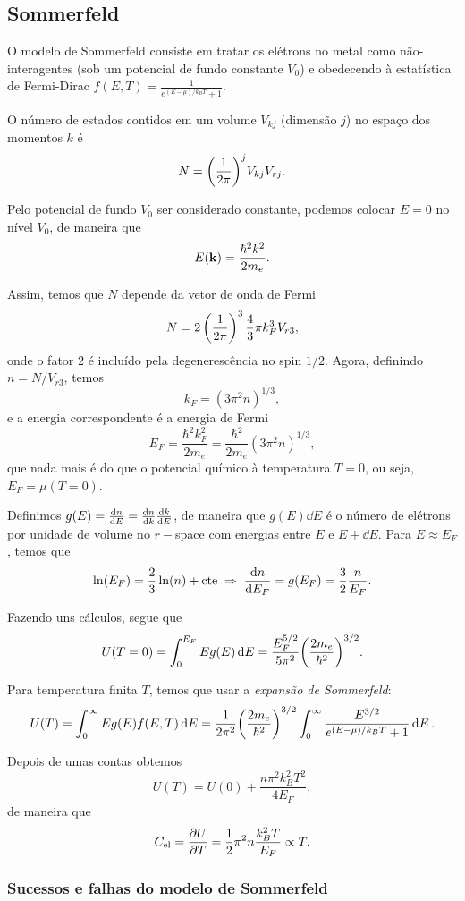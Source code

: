 \documentclass[a4paper,fleqn,12pt]{article}
\begin{document}
\subsection{Sommerfeld}

O modelo de Sommerfeld consiste em tratar os elétrons no metal como não-interagentes (sob um potencial de fundo constante $V_0$) e obedecendo à estatística de Fermi-Dirac $f(E, T) = \frac{1}{e^{(E-\mu)/k_B T} + 1}$.

O número de estados contidos em um volume $V_{kj}$ (dimensão $j$) no espaço dos momentos $k$ é
$$
N = \qty(\frac{1}{2\pi})^j V_{kj} V_{rj}.
$$

Pelo potencial de fundo $V_0$ ser considerado constante, podemos colocar $E = 0$ no nível $V_0$, de maneira que
$$
E(\vb{k}) = \frac{\hbar^2 k^2}{2 m_e}.
$$

Assim, temos que $N$ depende da vetor de onda de Fermi
$$
N = 2 \, \qty(\frac{1}{2\pi})^3 \, \frac{4}{3} \pi k_F^3 V_{r3},
$$
onde o fator $2$ é incluído pela degenerescência no spin $1/2$. Agora, definindo $\boxed{ n = N / V_{r3} }$, temos
$$
k_F = (3 \pi^2 n)^{1/3},
$$
e a energia correspondente é a energia de Fermi
$$
E_F = \frac{\hbar^2 k_F^2}{2 m_e} = \frac{\hbar^2}{2m_e} (3\pi^2 n)^{1/3},
$$
que nada mais é do que o potencial químico à temperatura $T = 0$, ou seja, $E_F = \mu(T = 0)$.

Definimos $g(E) = \dv{n}{E} = \dv{n}{k} \dv{k}{E}$, de maneira que $g(E) \dd{E}$ é o número de elétrons por unidade de volume no $r-$space com energias entre $E$ e $E + \dd{E}$. Para $E \approx E_F$, temos que
$$
\ln(E_F) = \frac{2}{3} \ln(n) + \text{cte} \; \Rightarrow \; \dv{n}{E_F} = g(E_F) = \frac{3}{2} \frac{n}{E_F}.
$$

Fazendo uns cálculos, segue que
$$
U(T = 0) = \int_0^{E_F} E g(E) \dd{E} = \frac{E_F^{5/2}}{5\pi^2} \qty(\frac{2m_e}{\hbar^2})^{3/2}.
$$

Para temperatura finita $T$, temos que usar a \textit{expansão de Sommerfeld}:
$$
U(T) = \int_0^\infty E g(E) f(E, T) \dd{E} = \frac{1}{2\pi^2}
\qty(\frac{2m_e}{\hbar^2})^{3/2}
\int_0^\infty \frac{E^{3/2}}{e^{(E-\mu)/k_B T}+1} \dd{E}.
$$

Depois de umas contas obtemos
$$
U(T) = U(0) + \frac{n \pi^2 k_B^2 T^2}{4 E_F},
$$
de maneira que
$$
C_{\text{el}} = \pdv{U}{T} = \frac{1}{2} \pi^2 n \frac{k_B^2 T}{E_F} \propto T.
$$

\subsubsection{Sucessos e falhas do modelo de Sommerfeld}
\end{document}
